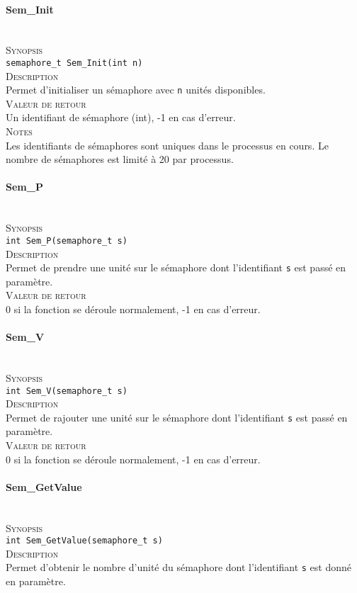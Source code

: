 \documentclass{report}
\newcommand{\myparagraph}[1]{\paragraph*{#1}\mbox{}\\}
\begin{document}
\myparagraph{Sem\_Init}
	
	\textsc{Synopsis}\\
		\texttt{semaphore\_t Sem\_Init(int n)}\\

\textsc{Description}\\
	Permet d'initialiser un sémaphore avec \texttt{n} unités disponibles.\\
	
\textsc{Valeur de retour}\\
	Un identifiant de sémaphore (int), -1 en cas d'erreur.\\

\textsc{Notes}\\
	Les identifiants de sémaphores sont uniques dans le processus en cours. Le nombre de sémaphores est limité à 20 par processus.\\
	
\myparagraph{Sem\_P}
\textsc{Synopsis}\\	
	\texttt{int Sem\_P(semaphore\_t s)}\\

\textsc{Description}\\
	Permet de prendre une unité sur le sémaphore dont l'identifiant \texttt{s} est passé en paramètre.\\
	
\textsc{Valeur de retour}\\
0 si la fonction se déroule normalement, -1 en cas d'erreur.\\

\myparagraph{Sem\_V}
\textsc{Synopsis}\\	

\texttt{int Sem\_V(semaphore\_t s)}\\

\textsc{Description}\\
	Permet de rajouter une unité sur le sémaphore dont l'identifiant \texttt{s} est passé en paramètre.\\
	
\textsc{Valeur de retour}\\
0 si la fonction se déroule normalement, -1 en cas d'erreur.\\

\myparagraph{Sem\_GetValue}

\textsc{Synopsis}\\	
	\texttt{int Sem\_GetValue(semaphore\_t s)}\\

\textsc{Description}\\
	Permet d'obtenir le nombre d'unité du sémaphore dont l'identifiant \texttt{s} est donné en paramètre.\\
	
\end{document}
